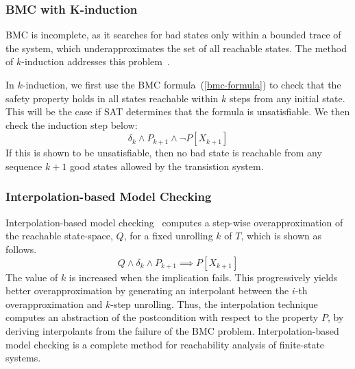 \subsubsection{BMC with K-induction} 

BMC is incomplete, as it searches for bad states only within a bounded trace of the system, 
which underapproximates the set of  all reachable states.  The method of 
$k$-induction addresses this problem~\cite{fmcad2000}.
  
In $k$-induction, we first use the BMC formula~(\ref{bmc-formula}) to check that the safety property
holds in all states reachable within $k$ steps from any initial state. This will be the case if SAT determines that the formula is unsatisfiable. We then check the induction step below: 
%
\[\delta_{k} \wedge P_{k+1} \wedge \neg P[X_{k+1}] \]
%
If this is shown to be unsatisfiable, then no bad state is reachable from any sequence $k{+}1$ good states
allowed by the transistion system. 

\subsubsection{Interpolation-based Model Checking} 
%
Interpolation-based model checking~\cite{cav03} 
computes a step-wise overapproximation of the reachable state-space,
$Q$, for a fixed unrolling $k$ of $T$, which is shown as
follows.
%
\[ Q \wedge \delta_{k} \wedge P_{k+1} \implies P[X_{k+1}] \]
%
The value of $k$ is increased when the implication fails. This
progressively yields better overapproximation by 
generating an interpolant between the $i$-th 
overapproximation and $k$-step unrolling.
Thus, the interpolation technique computes an abstraction 
of the postcondition with respect to the property $P$, 
by deriving interpolants from the failure of the
BMC problem.
%
Interpolation-based model checking is a complete method 
for reachability analysis of finite-state systems. 
%

